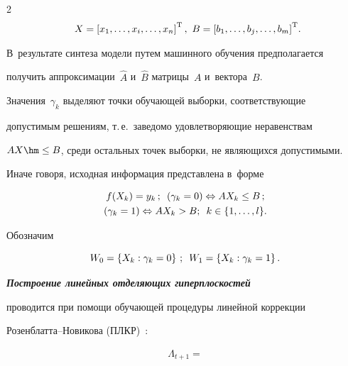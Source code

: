 \begin{multicols}{2}
\begin{multline*}
 X=\left[x_1,\dots,x_i,\dots,x_n\right]^{\mathrm{T}},\


B=\left[b_1,\dots,b_j,\dots,b_m\right]^{\mathrm{T}}\!.\hspace*{-4.8543pt}


\end{multline*}


В~результате синтеза модели путем машинного обуче\-ния предполагается 


получить аппроксимации~$\hat{A}$ и~$\hat{B}$ матрицы~$A$ и~вектора~$B$. 


Значения~$\gamma_k$ выделяют точки обучающей выборки, соответствующие 


допустимым решениям, т.\,е.\ заведомо удовлетворяющие неравенствам 


$ AX \hm\leq B$,  среди остальных точек выборки, не являющихся допустимыми. 


Иначе говоря, исходная информация представлена в~форме 


\begin{multline*}


f(X_k)=y_k\,;\enskip 


(\gamma_k = 0)\Leftrightarrow AX_k \leq B\,;\\ 


(\gamma_k = 1)\Leftrightarrow AX_k > B;\enskip k\in \{ 1,\dots,l\}.


\end{multline*}





Обозначим 


$$


W_0=\left\{ X_k: \gamma_k=0 \right\}\,;\enskip


W_1=\left\{ X_k: \gamma_k=1\right\}.


$$





{\bfseries\textit{Построение линейных отделяющих гиперплоскостей}} 


проводится при помощи обучающей процедуры линейной коррекции 


Ро\-зен\-блат\-та--Но\-ви\-ко\-ва (ПЛКР)~\cite{11-don}:





\noindent


\begin{multline*}


\Lambda_{t+1}={}\\



\end{multline*}
\end{multicols}
